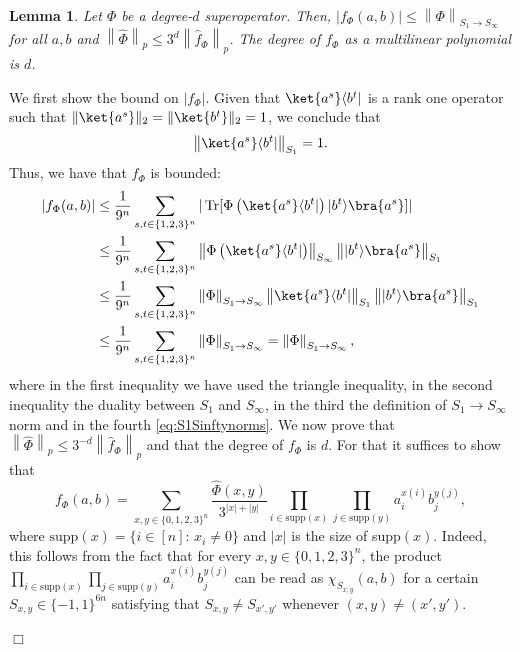 \documentclass[11pt]{article}
\newcommand{\norm}[1]{\left\|{#1}\right\|}
\theoremstyle{plain}
\newtheorem{lemma}[theorem]{Lemma}
\DeclareMathOperator{\Tr}{Tr}
\theoremstyle{plain}
\theoremstyle{definition}
\theoremstyle{remark}
\renewenvironment{proof}[1][]{
    \begin{trivlist}
    \item[\hspace{\labelsep}{\em\noindent Proof#1:\/}]}
    {{\hfill$\Box$}
    \end{trivlist}
}
\theoremstyle{named}
\begin{document}
\begin{lemma}\label{prop:propertiesfPhi}
    Let $\Phi$ be a degree-$d$ superoperator. Then,
    $|f_{\Phi}(a,b)|\leq \norm{\Phi}_{S_1\to S_\infty}$ for all $a,b$ and $\norm{\widehat\Phi}_{p}\leq 3^{d}\norm{\widehat f_{\Phi}}_p$. The degree of $f_{\Phi}$ as a multilinear polynomial is $d$. 
\end{lemma}
\begin{proof}
    We first show the bound on $|f_{\Phi}|$. Given that $\ket{a^s}\langle b^{t}|$ is a rank one operator such that $\|\ket{a^s}\|_2=\|\ket{b^t}\|_2=1$, we conclude that
    \begin{equation}\label{eq:S1Sinftynorms}
    \norm{\ket{a^s}\langle b^{t}|}_{S_1}=1.
    \end{equation}
    Thus, we have that $f_\Phi$ is bounded:
    \begin{align*}
        |f_{\Phi}( a,b)|&\leq \frac{1}{9^n}\sum_{s,t\in \{1,2,3\}^n}|\Tr[\Phi\left(\ket{a^s}\langle b^{t}|\right)|b^{t}\rangle \bra{a^{s}}]|\\
        &\leq \frac{1}{9^n}\sum_{s,t\in \{1,2,3\}^n}\norm{\Phi\left(\ket{a^s}\langle b^{t}|\right)}_{S_\infty}\norm{|b^{t}\rangle\bra{a^{s}}}_{S_{1}}\\
        &\leq \frac{1}{9^n}\sum_{s,t\in \{1,2,3\}^n}\norm{\Phi}_{S_1\to S_\infty}\norm{\ket{a^s}\langle b^{t}|}_{S_1}\norm{|b^{t}\rangle\bra{a^{s}}}_{S_{1}}\\
        &\leq \frac{1}{9^n}\sum_{s,t\in \{1,2,3\}^n}\norm{\Phi}_{S_1\to S_\infty}=\norm{\Phi}_{S_1\to S_\infty},
    \end{align*}
    where in the first inequality we have used the triangle inequality, in the second inequality  the duality between $S_1$ and $S_\infty$, in the third the definition of $S_1\to S_\infty$ norm and in the fourth \cref{eq:S1Sinftynorms}.  We now prove that $\norm{\widehat\Phi}_{p}\leq 3^{-d}\norm{\widehat f_{\Phi}}_p$ and that the degree of $f_{\Phi}$ is $d$. For that it suffices to show that 
    \begin{equation}\label{eq:fPhicoefficients}
        f_{\Phi}(a,b)=\sum_{x,y\in \{0,1,2,3\}^n} \frac{\widehat \Phi(x,y)}{3^{|x|+|y|}} \prod_{i\in \mathrm{supp}(x)}\prod_{j\in \mathrm{supp}(y)}a^{x(i)}_ib^{y(j)}_j,
    \end{equation}
    where $\mathrm{supp}(x)=\{i\in [n]:\, x_i\neq 0\}$ and $|x|$ is the size of supp$(x)$. Indeed, this follows from the fact that for every $x,y\in \{0,1,2,3\}^n$, the product $\prod_{i\in \mathrm{supp}(x)}\prod_{j\in \mathrm{supp}(y)}a^{x(i)}_ib^{y(j)}_j$ can be read as $\chi_{S_{x,y}}(a,b)$ for a certain $S_{x,y}\in \{-1,1\}^{6n}$ satisfying that $S_{x,y}\neq S_{x',y'}$ whenever $(x,y)\neq (x',y')$.
    

\end{proof}
\end{document}
